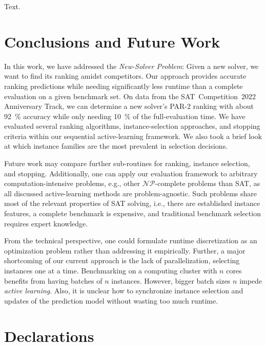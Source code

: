 \documentclass[sn-basic, Numbered]{sn-jnl} %
\begin{document}

Text.

\section{Conclusions and Future Work}


In this work, we have addressed the \emph{New-Solver Problem}:
Given a new solver, we want to find its ranking amidst competitors.
Our approach provides accurate ranking predictions while needing significantly less runtime than a complete evaluation on a given benchmark set.
On data from the SAT~Competition~2022 Anniversary Track, we can determine a new solver's PAR-2 ranking with about \SI{92}{\%} accuracy while only needing \SI{10}{\%} of the full-evaluation time.
We have evaluated several ranking algorithms, instance-selection approaches, and stopping criteria within our sequential active-learning framework.
We also took a brief look at which instance families are the most prevalent in selection decisions.

Future work may compare further sub-routines for ranking, instance selection, and stopping.
Additionally, one can apply our evaluation framework to arbitrary computation-intensive problems, e.g., other $\mathcal{NP}$-complete problems than SAT, as all discussed active-learning methods are problem-agnostic.
Such problems share most of the relevant properties of SAT solving, i.e., there are established instance features, a complete benchmark is expensive, and traditional benchmark selection requires expert knowledge.

From the technical perspective, one could formulate runtime discretization as an optimization problem rather than addressing it empirically.
Further, a major shortcoming of our current approach is the lack of parallelization, selecting instances one at a time.
Benchmarking on a computing cluster with $n$ cores benefits from having batches of $n$ instances.
However, bigger batch sizes $n$ impede \emph{active learning}.
Also, it is unclear how to synchronize instance selection and updates of the prediction model without wasting too much runtime.

\backmatter

\section*{Declarations}
\end{document}
